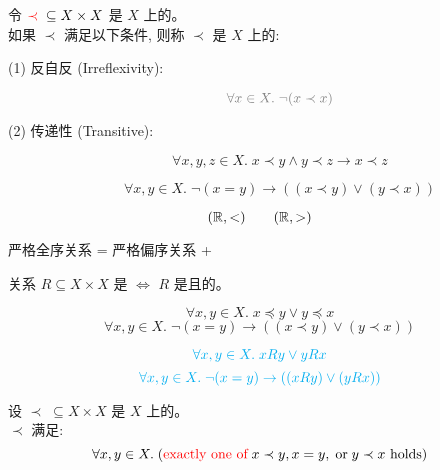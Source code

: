 \begin{frame}{}
  \begin{definition}
    令 $\textcolor{red}{\prec} \;\subseteq X \times X$ 是 $X$ 上的。\\[3pt]
    如果 $\prec$ 满足以下条件, 则称 $\prec$ 是 $X$ 上的: \\[6pt]
    \begin{description}
      \item[(1) 反自反 (Irreflexivity):]
        \[
          \gray{\forall x \in X.\; \lnot (x \prec x)}
        \]
      \item[(2) 传递性 (Transitive):]
        \[
          \forall x, y, z \in X.\; x \prec y \land y \prec z \to x \prec z
        \]
      \item[]
        \[
          \forall x, y \in X.\; \lnot (x = y) \to ((x \prec y) \lor (y \prec x))
        \]
    \end{description}
  \end{definition}

  \vspace{-0.20cm}
  \[
    (\mathbb{R}, <) \qquad (\mathbb{R}, >)
  \]
  \pause
  \vspace{-0.50cm}
  \begin{center}
    严格全序关系 = 严格偏序关系 + 
  \end{center}
\end{frame}

\begin{frame}{}
  \begin{theorem}
    关系 $R \subseteq X \times X$ 是
    $\iff$ $R$ 是且的。
  \end{theorem}
  \[
    \forall x, y \in X.\; x \preceq y \lor y \preceq x
  \]
  \[
    \forall x, y \in X.\; \lnot (x = y) \to ((x \prec y) \lor (y \prec x))
  \]

  \[
    \textcolor{cyan}{\forall x, y \in X.\; x R y \lor y R x}
  \]
  \[
    \textcolor{cyan}{\forall x, y \in X.\; \lnot (x = y) \to ((x R y) \lor (y R x))}
  \]
\end{frame}

\begin{frame}{}
  \begin{theorem}
    设 $\prec\; \subseteq X \times X$ 是 $X$ 上的。\\[5pt]
    $\prec$ 满足:
    \[
      \forall x, y \in X.\;
        (\text{\textcolor{red}{exactly one of}}\; x \prec y, x = y, \;\text{or}\; y \prec x \text{ holds})
    \]
  \end{theorem}
\end{frame}
